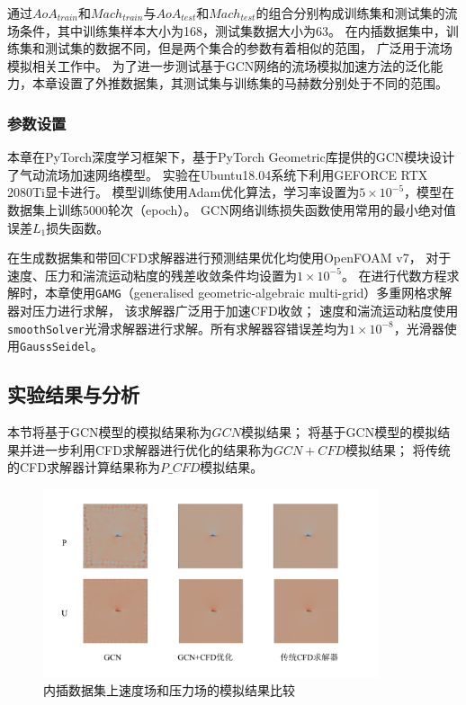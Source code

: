 通过${AoA}_{train}$和${Mach}_{train}$与${AoA}_{test}$和${Mach}_{test}$的组合分别构成训练集和测试集的流场条件，其中训练集样本大小为168，测试集数据大小为63。
在内插数据集中，训练集和测试集的数据不同，但是两个集合的参数有着相似的范围，
广泛用于流场模拟相关工作中\cite{bhatnagar2019prediction,DBLP:conf/kdd/GuoLI16}。
为了进一步测试基于GCN网络的流场模拟加速方法的泛化能力，本章设置了外推数据集，其测试集与训练集的马赫数分别处于不同的范围。



\subsubsection{参数设置}
本章在PyTorch深度学习框架下，基于PyTorch Geometric库提供的GCN模块设计了气动流场加速网络模型。
实验在Ubuntu18.04系统下利用GEFORCE RTX 2080Ti显卡进行。
模型训练使用Adam优化算法，学习率设置为$5\times10^{-5}$，模型在数据集上训练5000轮次（epoch）。
GCN网络训练损失函数使用常用的最小绝对值误差$L_1$损失函数。

在生成数据集和带回CFD求解器进行预测结果优化均使用OpenFOAM v7，
对于速度、压力和湍流运动粘度的残差收敛条件均设置为$1\times10^{-5}$。
在进行代数方程求解时，本章使用\texttt{GAMG}（generalised geometric-algebraic multi-grid）多重网格求解器对压力进行求解，
该求解器广泛用于加速CFD收敛；
速度和湍流运动粘度使用\texttt{smoothSolver}光滑求解器进行求解。所有求解器容错误差均为$1\times10^{-8}$，光滑器使用\texttt{GaussSeidel}。


\subsection{实验结果与分析}

本节将基于GCN模型的模拟结果称为$GCN$模拟结果；
将基于GCN模型的模拟结果并进一步利用CFD求解器进行优化的结果称为$GCN+CFD$模拟结果；
将传统的CFD求解器计算结果称为$P\_CFD$模拟结果。





\begin{figure}[htp]
	\centering
	\includegraphics[width=0.88\textwidth]{figures/gcn_result/chapter4/gcncomp.png}
	\caption{内插数据集上速度场和压力场的模拟结果比较}
	\label{fig:interresult}
\end{figure}

